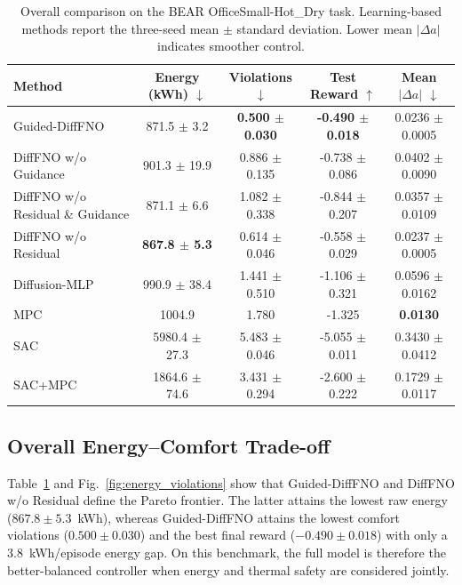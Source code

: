 \documentclass[lettersize,journal]{IEEEtran}
\theoremstyle{nonumberplain}     \theoremheaderfont{\bfseries\itshape}     \theorembodyfont{\normalfont}     \theoremseparator{:}     \theoremsymbol{\ensuremath{\blacksquare}}     \newtheorem{proof}{Proof}
\theoremstyle{plain}     \theoremheaderfont{\bfseries\itshape}     \theorembodyfont{\normalfont}     \theoremseparator{:}     \theoremsymbol{\ensuremath{\blacksquare}}     \newtheorem{remark}{Remark}
\begin{document}
\begin{table}[!t]
\centering
\caption{Overall comparison on the BEAR OfficeSmall-Hot\_Dry task. Learning-based methods report the three-seed mean $\pm$ standard deviation. Lower mean $|\Delta a|$ indicates smoother control.}
\label{tab:overall_results}
\footnotesize
\setlength{\tabcolsep}{4.5pt}
\renewcommand{\arraystretch}{1.12}
\begin{tabular}{lcccc}
\hline
Method & Energy (kWh) $\downarrow$ & Violations $\downarrow$ & Test Reward $\uparrow$ & Mean $|\Delta a|$ $\downarrow$ \\
\hline
Guided-DiffFNO & 871.5 $\pm$ 3.2 & \textbf{0.500 $\pm$ 0.030} & \textbf{-0.490 $\pm$ 0.018} & 0.0236 $\pm$ 0.0005 \\
DiffFNO w/o Guidance & 901.3 $\pm$ 19.9 & 0.886 $\pm$ 0.135 & -0.738 $\pm$ 0.086 & 0.0402 $\pm$ 0.0090 \\
DiffFNO w/o Residual \& Guidance & 871.1 $\pm$ 6.6 & 1.082 $\pm$ 0.338 & -0.844 $\pm$ 0.207 & 0.0357 $\pm$ 0.0109 \\
DiffFNO w/o Residual & \textbf{867.8 $\pm$ 5.3} & 0.614 $\pm$ 0.046 & -0.558 $\pm$ 0.029 & 0.0237 $\pm$ 0.0005 \\
Diffusion-MLP & 990.9 $\pm$ 38.4 & 1.441 $\pm$ 0.510 & -1.106 $\pm$ 0.321 & 0.0596 $\pm$ 0.0162 \\
MPC & 1004.9 & 1.780 & -1.325 & \textbf{0.0130} \\
SAC & 5980.4 $\pm$ 27.3 & 5.483 $\pm$ 0.046 & -5.055 $\pm$ 0.011 & 0.3430 $\pm$ 0.0412 \\
SAC+MPC & 1864.6 $\pm$ 74.6 & 3.431 $\pm$ 0.294 & -2.600 $\pm$ 0.222 & 0.1729 $\pm$ 0.0117 \\
\hline
\end{tabular}
\end{table}

\subsection{Overall Energy--Comfort Trade-off}

Table~\ref{tab:overall_results} and Fig.~\ref{fig:energy_violations} show that Guided-DiffFNO and DiffFNO w/o Residual define the Pareto frontier. The latter attains the lowest raw energy ($867.8 \pm 5.3$~kWh), whereas Guided-DiffFNO attains the lowest comfort violations ($0.500 \pm 0.030$) and the best final reward ($-0.490 \pm 0.018$) with only a $3.8$~kWh/episode energy gap. On this benchmark, the full model is therefore the better-balanced controller when energy and thermal safety are considered jointly.
\end{document}
